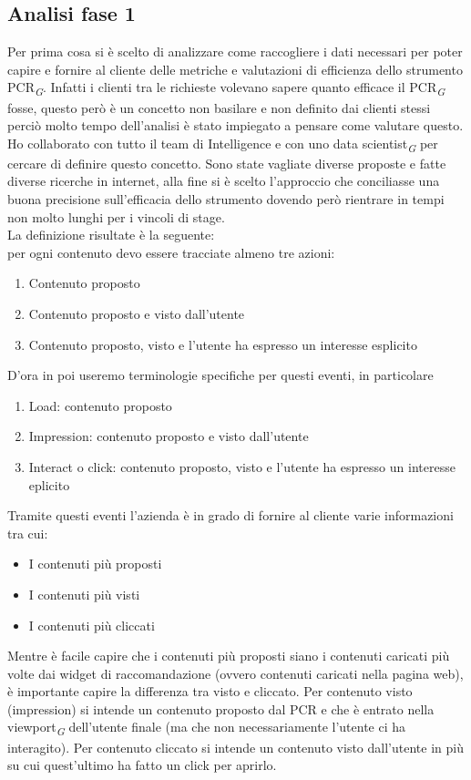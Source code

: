 \documentclass[a4paper, 12pt, twoside, openright]{book}
\newcommand{\gloss}[1]{#1\textsubscript{\textit{\tiny{G}}}}
\begin{document}
\subsection{Analisi fase 1}
Per prima cosa si è scelto di analizzare come raccogliere i dati necessari per poter capire e fornire al cliente delle metriche e valutazioni di efficienza dello strumento \gloss{PCR}. Infatti i clienti tra le richieste volevano sapere quanto efficace il \gloss{PCR} fosse, questo però è un concetto non basilare e non definito dai clienti stessi perciò molto tempo dell'analisi è stato impiegato a pensare come valutare questo.\\
Ho collaborato con tutto il team di Intelligence e con uno \gloss{data scientist} per cercare di definire questo concetto. Sono state vagliate diverse proposte e fatte diverse ricerche in internet, alla fine si è scelto l'approccio che conciliasse una buona precisione sull'efficacia dello strumento dovendo però rientrare in tempi non molto lunghi per i vincoli di stage.\\
La definizione risultate è la seguente:\\
per ogni contenuto devo essere tracciate almeno tre azioni:
\begin{enumerate}
\item Contenuto proposto
\item Contenuto proposto e visto dall'utente
\item Contenuto proposto, visto e l'utente ha espresso un interesse esplicito
\end{enumerate}
D'ora in poi useremo terminologie specifiche per questi eventi, in particolare
\begin{enumerate}
\item Load: contenuto proposto
\item Impression: contenuto proposto e visto dall'utente
\item Interact o click: contenuto proposto, visto e l'utente ha espresso un interesse eplicito
\end{enumerate}
Tramite questi eventi l'azienda è in grado di fornire al cliente varie informazioni tra cui:
\begin{itemize}
\item I contenuti più proposti
\item I contenuti più visti
\item I contenuti più cliccati
\end{itemize}
Mentre è facile capire che i contenuti più proposti siano i contenuti caricati più volte dai widget di raccomandazione (ovvero contenuti caricati nella pagina web), è importante capire la differenza tra visto e cliccato. Per contenuto visto (impression) si intende un contenuto proposto dal PCR e che è entrato nella \gloss{viewport} dell'utente finale (ma che non necessariamente l'utente ci ha interagito). Per contenuto cliccato si intende un contenuto visto dall'utente in più su cui quest'ultimo ha fatto un click per aprirlo.\\
\end{document}

